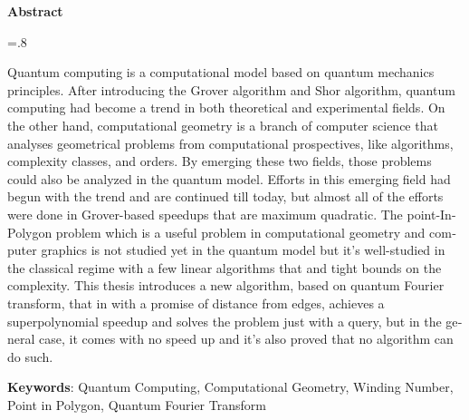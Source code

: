 


\pagestyle{empty}

\begin{latin}

\begin{center}
\textbf{Abstract}
\end{center}
\baselineskip=.8\baselineskip

Quantum computing is a computational model based on quantum mechanics principles. After introducing the Grover algorithm and Shor algorithm, quantum computing had become a trend in both theoretical and experimental fields. On the other hand, computational geometry is a branch of computer science that analyses geometrical problems from computational prospectives, like algorithms, complexity classes, and orders. By emerging these two fields, those problems could also be analyzed in the quantum model. Efforts in this emerging field had begun with the trend and are continued till today, but almost all of the efforts were done in Grover-based speedups that are maximum quadratic. The point-In-Polygon problem which is a useful problem in computational geometry and computer graphics is not studied yet in the quantum model but it's well-studied in the classical regime with a few linear algorithms that and tight bounds on the complexity. This thesis introduces a new algorithm, based on quantum Fourier transform, that in with a promise of distance from edges, achieves a superpolynomial speedup and solves the problem just with a query, but in the general case, it comes with no speed up and it's also proved that no algorithm can do such.

\bigskip\noindent\textbf{Keywords}:
Quantum Computing, Computational Geometry, Winding Number, Point in Polygon, Quantum Fourier Transform

\end{latin}

\newpage
